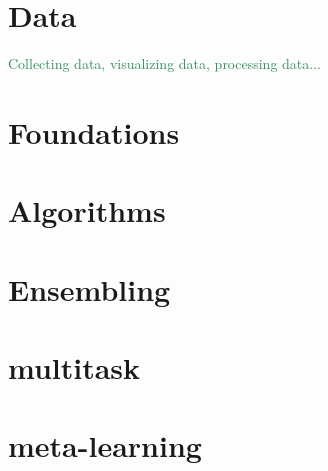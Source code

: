 \documentclass[12pt]{book}
\def\r#1{\textcolor{SeaGreen}{#1}}
\begin{document}



\part{Data}
\r{Collecting data, visualizing data, processing data...}



\part{Foundations}





\part{Algorithms}


\part{Ensembling}







\part{multitask}



\part{meta-learning}


\end{document}
